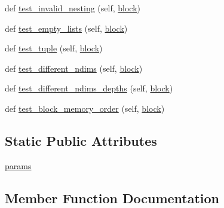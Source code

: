 \begin{DoxyCompactItemize}
def \hyperlink{classnumpy_1_1core_1_1tests_1_1test__shape__base_1_1TestBlock_a982f47a1071439df10d61e398a5ba30c}{test\+\_\+invalid\+\_\+nesting} (self, \hyperlink{classnumpy_1_1core_1_1tests_1_1test__shape__base_1_1TestBlock_a620b76e025cdd21f1afd8650278b981b}{block})
\item 
def \hyperlink{classnumpy_1_1core_1_1tests_1_1test__shape__base_1_1TestBlock_a147d415c1a697c208e50d1dcf323fe2e}{test\+\_\+empty\+\_\+lists} (self, \hyperlink{classnumpy_1_1core_1_1tests_1_1test__shape__base_1_1TestBlock_a620b76e025cdd21f1afd8650278b981b}{block})
\item 
def \hyperlink{classnumpy_1_1core_1_1tests_1_1test__shape__base_1_1TestBlock_a649cc7eaaf3f5cfe3297975ae8768c35}{test\+\_\+tuple} (self, \hyperlink{classnumpy_1_1core_1_1tests_1_1test__shape__base_1_1TestBlock_a620b76e025cdd21f1afd8650278b981b}{block})
\item 
def \hyperlink{classnumpy_1_1core_1_1tests_1_1test__shape__base_1_1TestBlock_acdb2f7c6e9cbb8e1cf2fef26ce71831f}{test\+\_\+different\+\_\+ndims} (self, \hyperlink{classnumpy_1_1core_1_1tests_1_1test__shape__base_1_1TestBlock_a620b76e025cdd21f1afd8650278b981b}{block})
\item 
def \hyperlink{classnumpy_1_1core_1_1tests_1_1test__shape__base_1_1TestBlock_ab0a0c8320d45ca4e18e62c02d1834280}{test\+\_\+different\+\_\+ndims\+\_\+depths} (self, \hyperlink{classnumpy_1_1core_1_1tests_1_1test__shape__base_1_1TestBlock_a620b76e025cdd21f1afd8650278b981b}{block})
\item 
def \hyperlink{classnumpy_1_1core_1_1tests_1_1test__shape__base_1_1TestBlock_aae0c1e4908c0ab759ce524cabfbf11e9}{test\+\_\+block\+\_\+memory\+\_\+order} (self, \hyperlink{classnumpy_1_1core_1_1tests_1_1test__shape__base_1_1TestBlock_a620b76e025cdd21f1afd8650278b981b}{block})
\end{DoxyCompactItemize}
\subsection*{Static Public Attributes}
\begin{DoxyCompactItemize}
\item 
\hyperlink{classnumpy_1_1core_1_1tests_1_1test__shape__base_1_1TestBlock_a9d6456ac4f7ed51b55b6a51657b62cde}{params}
\end{DoxyCompactItemize}


\subsection{Member Function Documentation}
\mbox{\label{classnumpy_1_1core_1_1tests_1_1test__shape__base_1_1TestBlock_a620b76e025cdd21f1afd8650278b981b}} 
